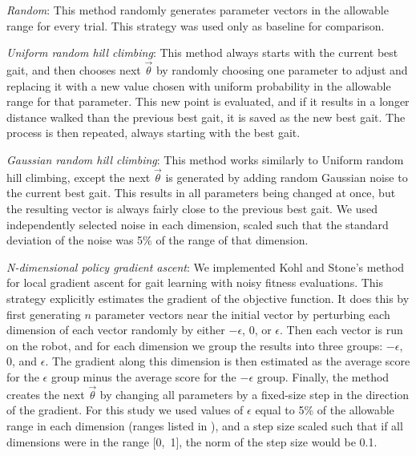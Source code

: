 


\emph{Random}: This method randomly generates parameter vectors in the allowable range for every trial.  This strategy was used only
  as baseline for comparison.

\emph{Uniform random hill climbing}: This method always starts
  with the current best gait, and then chooses next $\vec{\theta}$ by
  randomly choosing one parameter to adjust and replacing it with a
  new value chosen with uniform probability in the allowable range for
  that parameter. This new point is evaluated, and if it results in a
  longer distance walked than the previous best gait, it is saved as
  the new best gait. The process is then repeated, always starting
  with the best gait.

\emph{Gaussian random hill climbing}: This method works
  similarly to Uniform random hill climbing, except the next
  $\vec{\theta}$ is generated by adding random Gaussian noise to the
  current best gait.  This results in all parameters being changed at
  once, but the resulting vector is always fairly close to the
  previous best gait.  We used independently selected noise in each
  dimension, scaled such that the standard deviation of the noise was
  5\% of the range of that dimension.

\emph{N-dimensional policy gradient ascent}: We implemented Kohl
  and Stone's \citep{kohl} method for local gradient ascent for gait
  learning with noisy fitness evaluations. This strategy explicitly
  estimates the gradient of the objective function. It does this by
  first generating $n$ parameter vectors near the initial vector by
  perturbing each dimension of each vector randomly by either
  $-\epsilon$, $0$, or $\epsilon$. Then each vector is run on the
  robot, and for each dimension we group the results into three
  groups: $-\epsilon$, $0$, and $\epsilon$.  The gradient along this
  dimension is then estimated as the average score for the $\epsilon$
  group minus the average score for the $-\epsilon$ group. Finally,
  the method creates the next $\vec{\theta}$ by changing all
  parameters by a fixed-size step in the direction of the gradient.
  For this study we used values of $\epsilon$ equal to 5\% of the
  allowable range in each dimension (ranges listed in
  ), and a step size scaled such that if all dimensions
  were in the range [0,~1], the norm of the step size would be 0.1.

